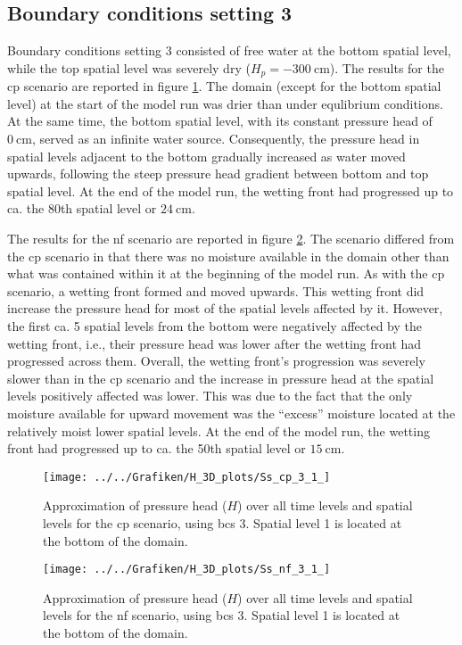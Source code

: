 \subsection{Boundary conditions setting 3}

Boundary conditions setting 3 consisted of free water at the bottom spatial level, while the top spatial level was severely dry ($H_p = \SI{-300}{\centi\meter}$).  The results for the cp scenario are reported in figure \ref{fig:cp3}.  The domain (except for the bottom spatial level) at the start of the model run was drier than under equlibrium conditions.  At the same time, the bottom spatial level, with its constant pressure head of $\SI{0}{\centi\meter}$, served as an infinite water source.  Consequently, the pressure head in spatial levels adjacent to the bottom gradually increased as water moved upwards, following the steep pressure head gradient between bottom and top spatial level.  At the end of the model run, the wetting front had progressed up to ca. the 80th spatial level or $\SI{24}{\centi\meter}$.

The results for the nf scenario are reported in figure \ref{fig:nf3}.  The scenario differed from the cp scenario in that there was no moisture available in the domain other than what was contained within it at the beginning of the model run.  As with the cp scenario, a wetting front formed and moved upwards.  This wetting front did increase the pressure head for most of the spatial levels affected by it.  However, the first ca. 5 spatial levels from the bottom were negatively affected by the wetting front, i.e., their pressure head was lower after the wetting front had progressed across them.  Overall, the wetting front’s progression was severely slower than in the cp scenario and the increase in pressure head at the spatial levels positively affected was lower.  This was due to the fact that the only moisture available for upward movement was the ``excess'' moisture located at the relatively moist lower spatial levels.  At the end of the model run, the wetting front had progressed up to ca. the 50th spatial level or $\SI{15}{\centi\meter}$.

\begin{figure}[H]
  \centering
  \texttt{[image: ../../Grafiken/H\_3D\_plots/Ss\_cp\_3\_1\_]}
  \caption{Approximation of pressure head ($H$) over all time levels and spatial levels for the cp scenario, using bcs 3.  Spatial level 1 is located at the bottom of the domain.}
  \label{fig:cp3}
\end{figure}

\begin{figure}[H]
  \centering
  \texttt{[image: ../../Grafiken/H\_3D\_plots/Ss\_nf\_3\_1\_]}
  \caption{Approximation of pressure head ($H$) over all time levels and spatial levels for the nf scenario, using bcs 3.  Spatial level 1 is located at the bottom of the domain.}
  \label{fig:nf3}
\end{figure}

